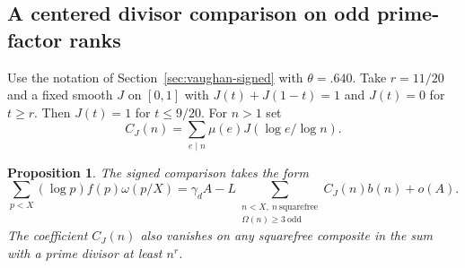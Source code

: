 \documentclass[11pt,a4paper]{article}
\theoremstyle{paperplain}
\newtheorem{proposition}[theorem]{Proposition}
\numberwithin{equation}{section}
\begin{document}
\subsection{A centered divisor comparison on odd prime-factor ranks}
\label{sec:centered-odd-rank-switch}

Use the notation of Section~\ref{sec:vaughan-signed} with $\theta=.640$.
Take $r=11/20$ and a fixed smooth $J$ on $[0,1]$ with
$J(t)+J(1-t)=1$ and $J(t)=0$ for $t\ge r$. Then $J(t)=1$ for
$t\le9/20$.
For $n>1$ set
\[
 C_J(n)=\sum_{e\mid n}\mu(e)J(\log e/\log n).
\]

\begin{proposition}\label{octal:centered-odd-rank-switch}
The signed comparison takes the form
\begin{equation}\label{eq:centered-odd-rank-identity}
 \sum_{p<X}(\log p)f(p)\omega(p/X)
 =\gamma_d A-
 L\sum_{\substack{n<X,\ n\ \mathrm{squarefree}\\
                       \Omega(n)\ge3\ \mathrm{odd}}} C_J(n)b(n)+o(A).
\end{equation}
The coefficient $C_J(n)$ also vanishes on any squarefree composite in
the sum with a prime divisor at least $n^r$.
\end{proposition}
\end{document}
